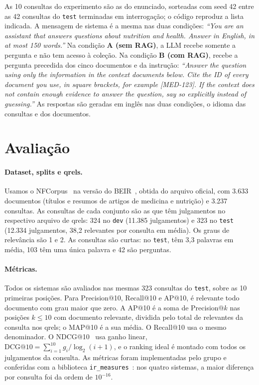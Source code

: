 \documentclass[11pt,a4paper]{article}
\newcommand{\cod}[1]{\texttt{#1}}
\begin{document}
As 10 consultas do experimento são as do enunciado, sorteadas com seed 42 entre as 42 consultas do \cod{test} terminadas em interrogação; o código reproduz a lista indicada. A mensagem de sistema é a mesma nas duas condições: \emph{``You are an assistant that answers questions about nutrition and health. Answer in English, in at most 150 words.''} Na condição \textbf{A (sem RAG)}, a LLM recebe somente a pergunta e não tem acesso à coleção. Na condição \textbf{B (com RAG)}, recebe a pergunta precedida dos cinco documentos e da instrução: \emph{``Answer the question using only the information in the context documents below. Cite the ID of every document you use, in square brackets, for example [MED-123]. If the context does not contain enough evidence to answer the question, say so explicitly instead of guessing.''} As respostas são geradas em inglês nas duas condições, o idioma das consultas e dos documentos.

\section{Avaliação}
\label{sec:avaliacao}

\paragraph{Dataset, splits e qrels.} Usamos o NFCorpus~\cite{boteva2016} na versão do BEIR~\cite{thakur2021}, obtida do arquivo oficial, com 3.633 documentos (títulos e resumos de artigos de medicina e nutrição) e 3.237 consultas. As consultas de cada conjunto são as que têm julgamentos no respectivo arquivo de qrels: 324 no \cod{dev} (11.385 julgamentos) e 323 no \cod{test} (12.334 julgamentos, 38,2 relevantes por consulta em média). Os graus de relevância são 1 e 2. As consultas são curtas: no \cod{test}, têm 3,3 palavras em média, 103 têm uma única palavra e 42 são perguntas.

\paragraph{Métricas.} Todos os sistemas são avaliados nas mesmas 323 consultas do \cod{test}, sobre as 10 primeiras posições. Para Precision@10, Recall@10 e AP@10, é relevante todo documento com grau maior que zero. A AP@10 é a soma de Precision@$k$ nas posições $k\le 10$ com documento relevante, dividida pelo total de relevantes da consulta nos qrels; o MAP@10 é a sua média. O Recall@10 usa o mesmo denominador. O NDCG@10~\cite{jarvelin2002} usa ganho linear, $\mathrm{DCG@10}=\sum_{i=1}^{10} g_i/\log_2(i+1)$, e o ranking ideal é montado com todos os julgamentos da consulta. As métricas foram implementadas pelo grupo e conferidas com a biblioteca \cod{ir\_measures}~\cite{macavaney2022}: nos quatro sistemas, a maior diferença por consulta foi da ordem de $10^{-16}$.
\end{document}
